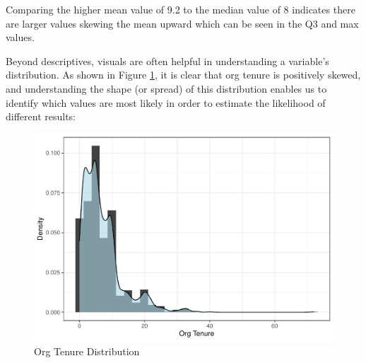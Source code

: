 \documentclass[]{book}
\newenvironment{Shaded}{\begin{snugshade}}{\end{snugshade}}
\newcommand{\CommentTok}[1]{\textcolor[rgb]{0.56,0.35,0.01}{\textit{#1}}}
\newcommand{\DataTypeTok}[1]{\textcolor[rgb]{0.13,0.29,0.53}{#1}}
\newcommand{\FloatTok}[1]{\textcolor[rgb]{0.00,0.00,0.81}{#1}}
\newcommand{\KeywordTok}[1]{\textcolor[rgb]{0.13,0.29,0.53}{\textbf{#1}}}
\newcommand{\NormalTok}[1]{#1}
\newcommand{\OperatorTok}[1]{\textcolor[rgb]{0.81,0.36,0.00}{\textbf{#1}}}
\newcommand{\StringTok}[1]{\textcolor[rgb]{0.31,0.60,0.02}{#1}}
\begin{document}
Comparing the higher mean value of 9.2 to the median value of 8 indicates there are larger values skewing the mean upward which can be seen in the Q3 and max values.

Beyond descriptives, visuals are often helpful in understanding a variable's distribution. As shown in Figure \ref{fig:org-tenure-dist}, it is clear that org tenure is positively skewed, and understanding the shape (or spread) of this distribution enables us to identify which values are most likely in order to estimate the likelihood of different results:

\begin{Shaded}
\end{Shaded}

\begin{figure}

{\centering \includegraphics{The_People_Analytics_Companion_files/figure-latex/org-tenure-dist-1} 

}

\caption{Org Tenure Distribution}\label{fig:org-tenure-dist}
\end{figure}
\end{document}

